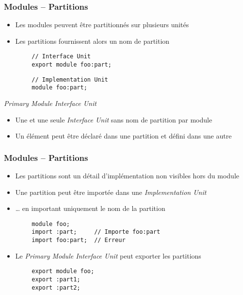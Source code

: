 \documentclass[C++.tex]{subfiles}
\begin{document}
\begin{frame}[fragile]
	\frametitle{Modules -- Partitions}
	\begin{itemize}
		\item Les modules peuvent être partitionnés sur plusieurs unités
		\item Les partitions fournissent alors un nom de partition
	\end{itemize}

	\begin{verbatim}
		// Interface Unit
		export module foo:part;
	\end{verbatim}

	\begin{verbatim}
		// Implementation Unit
		module foo:part;
	\end{verbatim}

	\begin{alertblock}{\textit{Primary Module Interface Unit}}
		\begin{itemize}
			\item Une et une seule \textit{Interface Unit} sans nom de partition par module
		\end{itemize}
	\end{alertblock}

	\begin{itemize}
		\item Un élément peut être déclaré dans une partition et défini dans une autre
	\end{itemize}
\end{frame}

\begin{frame}[fragile]
	\frametitle{Modules -- Partitions}
	\begin{itemize}
		\item Les partitions sont un détail d'implémentation non visibles hors du module


		\item Une partition peut être importée dans une \textit{Implementation Unit}
		\item \ldots{} en important uniquement le nom de la partition
	\end{itemize}

	\begin{verbatim}
		module foo;
		import :part;     // Importe foo:part
		import foo:part;  // Erreur
	\end{verbatim}

	\begin{itemize}
		\item Le \textit{Primary Module Interface Unit} peut exporter les partitions
	\end{itemize}

	\begin{verbatim}
		export module foo;
		export :part1;
		export :part2;
	\end{verbatim}
\end{frame}
\end{document}
